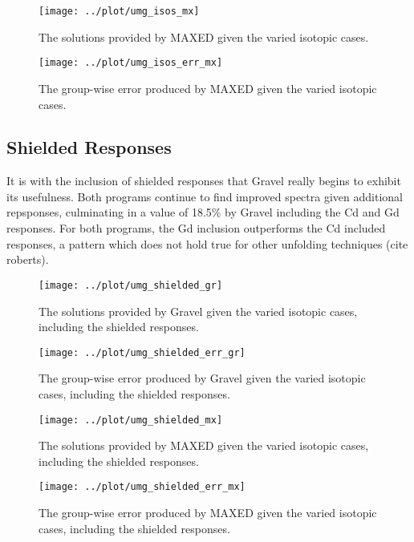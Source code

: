 \documentclass[journal]{IEEEtran}
\begin{document}
\begin{figure}[h!tb]
  \centering
  \texttt{[image: ../plot/umg\_isos\_mx]}
  \caption{The solutions provided by MAXED given the varied  isotopic cases.}
  \label{fig:isos_mx}
\end{figure}

\begin{figure}[h!tb]
  \centering
  \texttt{[image: ../plot/umg\_isos\_err\_mx]}
  \caption{The group-wise error produced by MAXED given the varied  isotopic cases.}
  \label{fig:isos_err_mx}
\end{figure}

\subsection{Shielded Responses}

It is with the inclusion of shielded responses that Gravel really begins to exhibit its usefulness.
Both programs continue to find improved spectra given additional repsponses, culminating in a value of 18.5\% by Gravel including the Cd and Gd responses.
For both programs, the Gd inclusion outperforms the Cd included responses, a pattern which does not hold true for other unfolding techniques (cite roberts).

\begin{figure}[h!tb]
  \centering
  \texttt{[image: ../plot/umg\_shielded\_gr]}
  \caption{The solutions provided by Gravel given the varied isotopic cases, including the shielded responses.}
  \label{fig:shielded_gr}
\end{figure}

\begin{figure}[h!tb]
  \centering
  \texttt{[image: ../plot/umg\_shielded\_err\_gr]}
  \caption{The group-wise error produced by Gravel given the varied isotopic cases, including the shielded responses.}
  \label{fig:shielded_err_gr}
\end{figure}

\begin{figure}[h!tb]
  \centering
  \texttt{[image: ../plot/umg\_shielded\_mx]}
  \caption{The solutions provided by MAXED given the varied isotopic cases, including the shielded responses.}
  \label{fig:shielded_mx}
\end{figure}

\begin{figure}[h!tb]
  \centering
  \texttt{[image: ../plot/umg\_shielded\_err\_mx]}
  \caption{The group-wise error produced by MAXED given the varied isotopic cases, including the shielded responses.}
  \label{fig:shielded_err_mx}
\end{figure}
\end{document}

